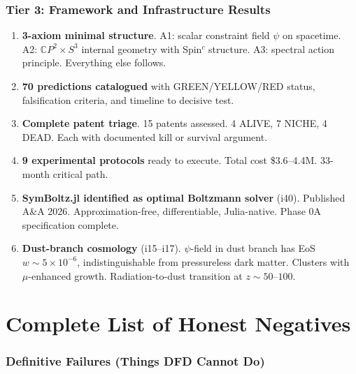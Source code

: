 \documentclass[11pt,a4paper]{article}
\newcommand{\CP}{\mathbb{C}P}
\begin{document}
\section{Tier 3: Framework and Infrastructure Results}

\begin{enumerate}[resume, label=\textbf{B\arabic*.}, leftmargin=2cm]

\item \textbf{3-axiom minimal structure}. A1: scalar constraint field $\psi$ on spacetime. A2: $\CP^2 \times S^3$ internal geometry with Spin$^c$ structure. A3: spectral action principle. Everything else follows.

\item \textbf{70 predictions catalogued} with GREEN/YELLOW/RED status, falsification criteria, and timeline to decisive test.

\item \textbf{Complete patent triage}. 15 patents assessed. 4 ALIVE, 7 NICHE, 4 DEAD. Each with documented kill or survival argument.

\item \textbf{9 experimental protocols} ready to execute. Total cost \$3.6--4.4M. 33-month critical path.

\item \textbf{SymBoltz.jl identified as optimal Boltzmann solver} (i40). Published A\&A 2026. Approximation-free, differentiable, Julia-native. Phase 0A specification complete.

\item \textbf{Dust-branch cosmology} (i15--i17). $\psi$-field in dust branch has EoS $w \sim 5 \times 10^{-6}$, indistinguishable from pressureless dark matter. Clusters with $\mu$-enhanced growth. Radiation-to-dust transition at $z \sim 50$--$100$.

\end{enumerate}


\part{Complete List of Honest Negatives}
\label{part:negatives}

\section{Definitive Failures (Things DFD Cannot Do)}
\end{document}
